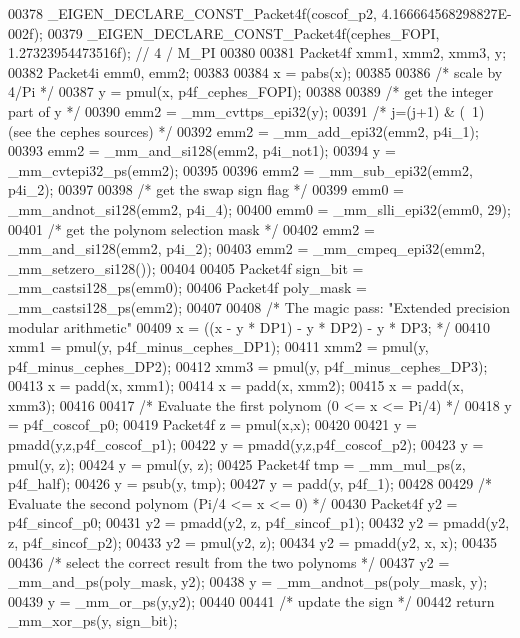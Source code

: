 \begin{DoxyCode}
00378   \_EIGEN\_DECLARE\_CONST\_Packet4f(coscof\_p2,  4.166664568298827E-002f);
00379   \_EIGEN\_DECLARE\_CONST\_Packet4f(cephes\_FOPI, 1.27323954473516f); \textcolor{comment}{// 4 / M\_PI}
00380 
00381   Packet4f xmm1, xmm2, xmm3, y;
00382   Packet4i emm0, emm2;
00383 
00384   x = pabs(x);
00385 
00386   \textcolor{comment}{/* scale by 4/Pi */}
00387   y = pmul(x, p4f\_cephes\_FOPI);
00388 
00389   \textcolor{comment}{/* get the integer part of y */}
00390   emm2 = \_mm\_cvttps\_epi32(y);
00391   \textcolor{comment}{/* j=(j+1) & (~1) (see the cephes sources) */}
00392   emm2 = \_mm\_add\_epi32(emm2, p4i\_1);
00393   emm2 = \_mm\_and\_si128(emm2, p4i\_not1);
00394   y = \_mm\_cvtepi32\_ps(emm2);
00395 
00396   emm2 = \_mm\_sub\_epi32(emm2, p4i\_2);
00397 
00398   \textcolor{comment}{/* get the swap sign flag */}
00399   emm0 = \_mm\_andnot\_si128(emm2, p4i\_4);
00400   emm0 = \_mm\_slli\_epi32(emm0, 29);
00401   \textcolor{comment}{/* get the polynom selection mask */}
00402   emm2 = \_mm\_and\_si128(emm2, p4i\_2);
00403   emm2 = \_mm\_cmpeq\_epi32(emm2, \_mm\_setzero\_si128());
00404 
00405   Packet4f sign\_bit = \_mm\_castsi128\_ps(emm0);
00406   Packet4f poly\_mask = \_mm\_castsi128\_ps(emm2);
00407 
00408   \textcolor{comment}{/* The magic pass: "Extended precision modular arithmetic"}
00409 \textcolor{comment}{     x = ((x - y * DP1) - y * DP2) - y * DP3; */}
00410   xmm1 = pmul(y, p4f\_minus\_cephes\_DP1);
00411   xmm2 = pmul(y, p4f\_minus\_cephes\_DP2);
00412   xmm3 = pmul(y, p4f\_minus\_cephes\_DP3);
00413   x = padd(x, xmm1);
00414   x = padd(x, xmm2);
00415   x = padd(x, xmm3);
00416 
00417   \textcolor{comment}{/* Evaluate the first polynom  (0 <= x <= Pi/4) */}
00418   y = p4f\_coscof\_p0;
00419   Packet4f z = pmul(x,x);
00420 
00421   y = pmadd(y,z,p4f\_coscof\_p1);
00422   y = pmadd(y,z,p4f\_coscof\_p2);
00423   y = pmul(y, z);
00424   y = pmul(y, z);
00425   Packet4f tmp = \_mm\_mul\_ps(z, p4f\_half);
00426   y = psub(y, tmp);
00427   y = padd(y, p4f\_1);
00428 
00429   \textcolor{comment}{/* Evaluate the second polynom  (Pi/4 <= x <= 0) */}
00430   Packet4f y2 = p4f\_sincof\_p0;
00431   y2 = pmadd(y2, z, p4f\_sincof\_p1);
00432   y2 = pmadd(y2, z, p4f\_sincof\_p2);
00433   y2 = pmul(y2, z);
00434   y2 = pmadd(y2, x, x);
00435 
00436   \textcolor{comment}{/* select the correct result from the two polynoms */}
00437   y2 = \_mm\_and\_ps(poly\_mask, y2);
00438   y  = \_mm\_andnot\_ps(poly\_mask, y);
00439   y  = \_mm\_or\_ps(y,y2);
00440 
00441   \textcolor{comment}{/* update the sign */}
00442   \textcolor{keywordflow}{return} \_mm\_xor\_ps(y, sign\_bit);

\end{DoxyCode}
